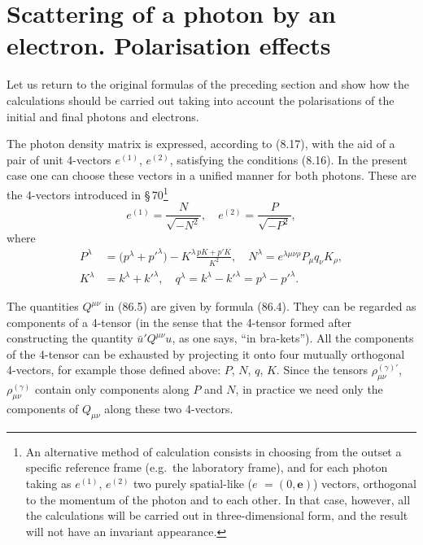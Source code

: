 
\section{Scattering of a photon by an electron. Polarisation effects}


Let us return to the original formulas of the preceding section and show how the calculations should be carried out taking into account the polarisations of the initial and final photons and electrons.

The photon density matrix is expressed, according to (8.17), with the aid of a pair of unit 4-vectors $e^{(1)}$, $e^{(2)}$, satisfying the conditions (8.16). In the present case one can choose these vectors in a unified manner for both photons. These are the 4-vectors introduced in \S\,70\footnote{An alternative method of calculation consists in choosing from the outset a specific reference frame (e.g.\ the laboratory frame), and for each photon taking as $e^{(1)}$, $e^{(2)}$ two purely spatial-like ({\boldmath$e$} $= (0, \mathbf{e})$) vectors, orthogonal to the momentum of the photon and to each other. In that case, however, all the calculations will be carried out in three-dimensional form, and the result will not have an invariant appearance.}
\begin{equation}
e^{(1)} = \frac{N}{\sqrt{-N^2}}, \quad e^{(2)} = \frac{P}{\sqrt{-P^2}},
\label{eq:87.1}
\end{equation}
where
\begin{equation}
\begin{aligned}
P^\lambda &= \bigl(p^\lambda + p'^\lambda\bigr) - K^\lambda\frac{pK + p'K}{K^2}, \quad N^\lambda = e^{\lambda\mu\nu\rho}P_\mu q_\nu K_\rho, \\
K^\lambda &= k^\lambda + k'^\lambda, \quad q^\lambda = k^\lambda - k'^\lambda = p^\lambda - p'^\lambda.
\end{aligned}
\label{eq:87.2}
\end{equation}

The quantities $Q^{\mu\nu}$ in (86.5) are given by formula (86.4). They can be regarded as components of a 4-tensor (in the sense that the 4-tensor formed after constructing the quantity $\bar{u}'Q^{\mu\nu}u$, as one says, ``in bra-kets''). All the components of the 4-tensor can be exhausted by projecting it onto four mutually orthogonal 4-vectors, for example those defined above: $P$, $N$, $q$, $K$. Since the tensors $\rho^{(\gamma)\prime}_{\mu\nu}$, $\rho^{(\gamma)}_{\mu\nu}$ contain only components along $P$ and $N$, in practice we need only the components of $Q_{\mu\nu}$ along these two 4-vectors.

